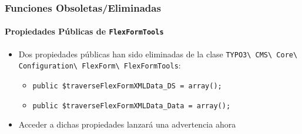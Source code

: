 \begin{frame}[fragile]
	\frametitle{Funciones Obsoletas/Eliminadas}
	\framesubtitle{Propiedades Públicas de \texttt{FlexFormTools}}

	\begin{itemize}
		\item Dos propiedades públicas han sido eliminadas de la clase
			\texttt{TYPO3\textbackslash
				CMS\textbackslash
				Core\textbackslash
				Configuration\textbackslash
				FlexForm\textbackslash
				FlexFormTools}:

		\begin{itemize}
			\item \texttt{public \$traverseFlexFormXMLData\_DS = array();}
			\item \texttt{public \$traverseFlexFormXMLData\_Data = array();}
		\end{itemize}

		\item Acceder a dichas propiedades lanzará una advertencia ahora

	\end{itemize}

\end{frame}



